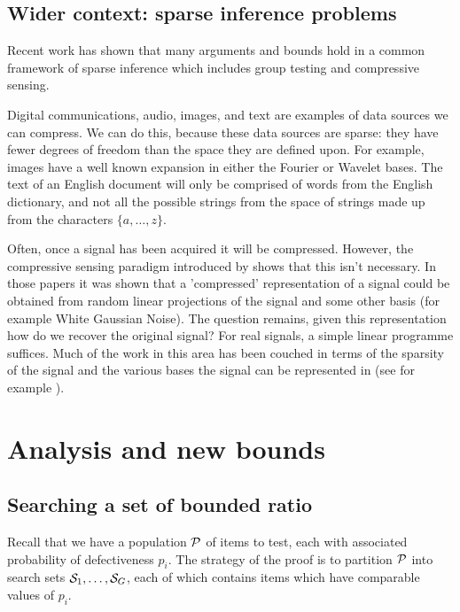 \subsection{Wider context: sparse inference problems}

Recent work \cite{aksoylar,tan} has shown that many arguments and bounds hold in a common framework of sparse inference
which includes group testing and compressive sensing.

Digital communications, audio, images, and text are examples of data sources we can compress. We can do this, because these data sources are sparse: they have fewer degrees of freedom than the space they are defined upon. 
For example, images have a well known expansion in either the Fourier or Wavelet bases. The text of an English document will only be comprised of words from the English dictionary, and not all the possible strings from the space of strings made up from the characters \(\{a, \ldots, z \}\). 

Often, once a signal has been acquired it will be compressed. However, the compressive sensing paradigm introduced by
\cite{Candes2006,donoho2} shows that this isn't necessary. In those papers it was shown that a 'compressed' representation of a signal could be obtained from random linear projections of the signal and some other basis (for example White Gaussian Noise). The question remains, given this representation how do we recover the original signal? For real signals, a simple linear programme suffices.
Much of the work in this area has been couched in terms of the sparsity of the signal and the various bases the signal can be represented in (see for example \cite{Candes2006,donoho2}). 


\section{Analysis and new bounds}

\subsection{Searching a set of bounded ratio} \label{sec:boundedratio}

Recall that we have a population ${\mathcal{P}}$ of items to test, each with associated probability of defectiveness $p_i$.
The strategy of the proof is to partition ${\mathcal{P}}$ 
 into search sets ${\mathcal{S}}_1, \ldots, {\mathcal{S}}_G$, each of which contains items which have
comparable values of $p_i$.

